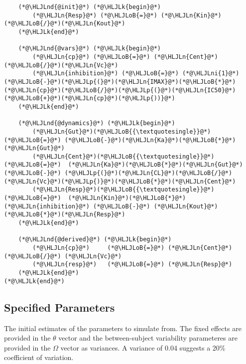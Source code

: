 \documentclass[12pt,a4paper]{article}
\newcommand{\HLJLk}[1]{\textcolor[RGB]{148,91,176}{\textbf{#1}}}
\newcommand{\HLJLn}[1]{#1}
\newcommand{\HLJLnd}[1]{\textcolor[RGB]{214,102,97}{#1}}
\newcommand{\HLJLni}[1]{\textcolor[RGB]{59,151,46}{#1}}
\newcommand{\HLJLoB}[1]{\textcolor[RGB]{102,102,102}{\textbf{#1}}}
\newcommand{\HLJLp}[1]{#1}
\begin{document}
\begin{lstlisting}
    (*@\HLJLnd{@init}@*) (*@\HLJLk{begin}@*)
        (*@\HLJLn{Resp}@*) (*@\HLJLoB{=}@*) (*@\HLJLn{Kin}@*)(*@\HLJLoB{/}@*)(*@\HLJLn{Kout}@*)
    (*@\HLJLk{end}@*)

    (*@\HLJLnd{@vars}@*) (*@\HLJLk{begin}@*)
        (*@\HLJLn{cp}@*) (*@\HLJLoB{=}@*) (*@\HLJLn{Cent}@*)(*@\HLJLoB{/}@*)(*@\HLJLn{Vc}@*)
        (*@\HLJLn{inhibition}@*) (*@\HLJLoB{=}@*) (*@\HLJLni{1}@*)(*@\HLJLoB{-}@*)(*@\HLJLp{(}@*)(*@\HLJLn{IMAX}@*)(*@\HLJLoB{*}@*)(*@\HLJLn{cp}@*)(*@\HLJLoB{/}@*)(*@\HLJLp{(}@*)(*@\HLJLn{IC50}@*)(*@\HLJLoB{+}@*)(*@\HLJLn{cp}@*)(*@\HLJLp{))}@*)
    (*@\HLJLk{end}@*)

    (*@\HLJLnd{@dynamics}@*) (*@\HLJLk{begin}@*)
        (*@\HLJLn{Gut}@*)(*@\HLJLoB{{\textquotesingle}}@*)    (*@\HLJLoB{=}@*) (*@\HLJLoB{-}@*)(*@\HLJLn{Ka}@*)(*@\HLJLoB{*}@*)(*@\HLJLn{Gut}@*)
        (*@\HLJLn{Cent}@*)(*@\HLJLoB{{\textquotesingle}}@*)   (*@\HLJLoB{=}@*)  (*@\HLJLn{Ka}@*)(*@\HLJLoB{*}@*)(*@\HLJLn{Gut}@*) (*@\HLJLoB{-}@*) (*@\HLJLp{(}@*)(*@\HLJLn{CL}@*)(*@\HLJLoB{/}@*)(*@\HLJLn{Vc}@*)(*@\HLJLp{)}@*)(*@\HLJLoB{*}@*)(*@\HLJLn{Cent}@*)
        (*@\HLJLn{Resp}@*)(*@\HLJLoB{{\textquotesingle}}@*)   (*@\HLJLoB{=}@*)  (*@\HLJLn{Kin}@*)(*@\HLJLoB{*}@*)(*@\HLJLn{inhibition}@*) (*@\HLJLoB{-}@*) (*@\HLJLn{Kout}@*)(*@\HLJLoB{*}@*)(*@\HLJLn{Resp}@*)
    (*@\HLJLk{end}@*)

    (*@\HLJLnd{@derived}@*) (*@\HLJLk{begin}@*)
        (*@\HLJLn{cp}@*)     (*@\HLJLoB{=}@*) (*@\HLJLn{Cent}@*) (*@\HLJLoB{/}@*) (*@\HLJLn{Vc}@*)
        (*@\HLJLn{resp}@*)   (*@\HLJLoB{=}@*) (*@\HLJLn{Resp}@*)
    (*@\HLJLk{end}@*)
(*@\HLJLk{end}@*)
\end{lstlisting}


\subsection{Specified Parameters}
The initial estimates of the parameters to simulate from. The fixed effects are provided in the \ensuremath{\theta} vector and the between-subject variability parameteres are provided in the \ensuremath{\Omega} vector as variances. A variance of 0.04 suggests a 20\% coefficient of variation.
\end{document}
